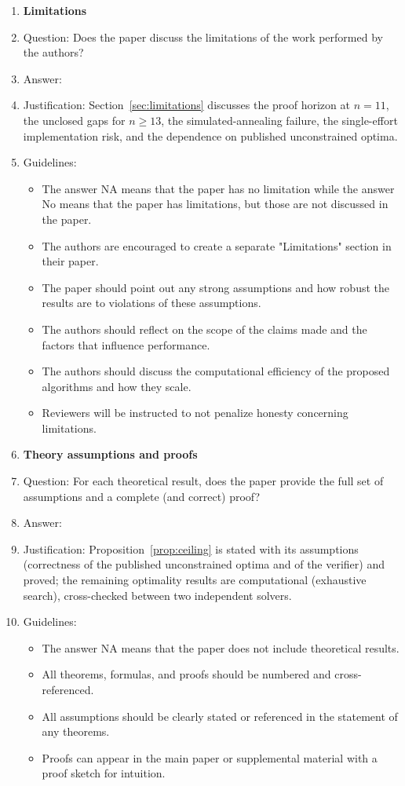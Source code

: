 \documentclass{article}
\begin{document}
\begin{enumerate}
\item {\bf Limitations}
    \item[] Question: Does the paper discuss the limitations of the work performed by the authors?
    \item[] Answer: \answerYes{}
    \item[] Justification: Section~\ref{sec:limitations} discusses the proof horizon at $n=11$, the unclosed gaps for $n\ge 13$, the simulated-annealing failure, the single-effort implementation risk, and the dependence on published unconstrained optima.
    \item[] Guidelines:
    \begin{itemize}
        \item The answer NA means that the paper has no limitation while the answer No means that the paper has limitations, but those are not discussed in the paper.
        \item The authors are encouraged to create a separate "Limitations" section in their paper.
        \item The paper should point out any strong assumptions and how robust the results are to violations of these assumptions.
        \item The authors should reflect on the scope of the claims made and the factors that influence performance.
        \item The authors should discuss the computational efficiency of the proposed algorithms and how they scale.
        \item Reviewers will be instructed to not penalize honesty concerning limitations.
    \end{itemize}

\item {\bf Theory assumptions and proofs}
    \item[] Question: For each theoretical result, does the paper provide the full set of assumptions and a complete (and correct) proof?
    \item[] Answer: \answerYes{}
    \item[] Justification: Proposition~\ref{prop:ceiling} is stated with its assumptions (correctness of the published unconstrained optima and of the verifier) and proved; the remaining optimality results are computational (exhaustive search), cross-checked between two independent solvers.
    \item[] Guidelines:
    \begin{itemize}
        \item The answer NA means that the paper does not include theoretical results.
        \item All theorems, formulas, and proofs should be numbered and cross-referenced.
        \item All assumptions should be clearly stated or referenced in the statement of any theorems.
        \item Proofs can appear in the main paper or supplemental material with a proof sketch for intuition.
    \end{itemize}


\end{enumerate}
\end{document}
